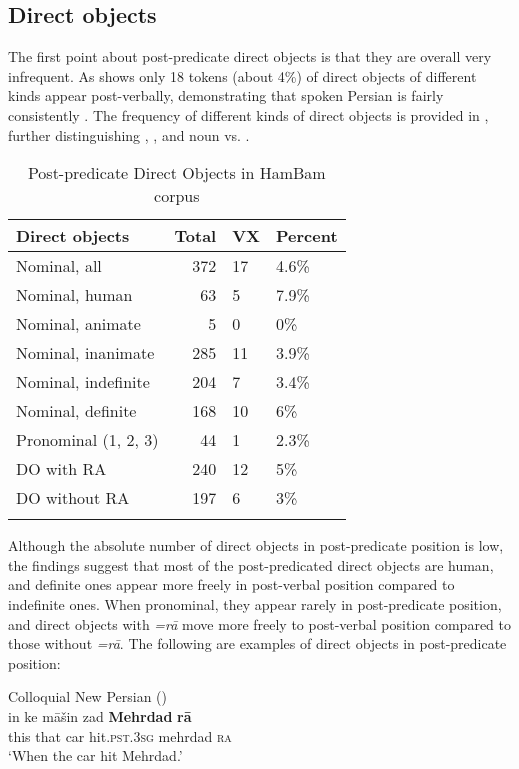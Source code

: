 \documentclass[output=paper,colorlinks,citecolor=brown,draftmode]{langscibook}
\begin{document}
\subsection{Direct objects}\label{Persian:3.2}

The first point about post-predicate direct objects is that they are overall very infrequent. As  shows only 18 tokens (about 4\%) of direct objects of different kinds appear post-verbally, demonstrating that spoken Persian is fairly consistently . The frequency of different kinds of direct objects is provided in , further distinguishing , , and noun vs. .

\begin{table}
 \begin{tabularx}{\textwidth}{lrYY}
\lsptoprule
Direct objects & Total & VX & Percent \\
\midrule
Nominal, all & 372 & 17 & 4.6\% \\
{\quad}Nominal, human & 63 & 5 & 7.9\% \\
{\quad}Nominal, animate & 5 & 0 & 0\% \\
{\quad}Nominal, inanimate & 285 & 11 & 3.9\% \\
Nominal, indefinite & 204 & 7 & 3.4\% \\
Nominal, definite & 168 & 10 & 6\% \\
Pronominal (1, 2, 3) & 44 & 1 & 2.3\% \\
DO with RA & 240 & 12 & 5\% \\
DO without RA & 197 & 6 & 3\% \\
\lspbottomrule
 \end{tabularx}
 \caption{Post-predicate Direct Objects in HamBam corpus}
 \label{Persian:tab:10}
\end{table}

Although the absolute number of direct objects in post-predicate position is low, the findings suggest that most of the post-predicated direct objects are human, and definite ones appear more freely in post-verbal position compared to indefinite ones. When pronominal, they appear rarely in post-predicate position, and direct objects with \textit{=rā} move more freely to post-verbal position compared to those without \textit{=rā}. The following are examples of direct objects in post-predicate position:

\ea\label{Persian:ex:28}
Colloquial New Persian (\citealt[F, 0797]{Izadi2022Persian}) \\
\gll in ke māšin zad \textbf{Mehrdad} \textbf{rā} \\
this that car hit\textsc{.pst.3sg} mehrdad \textsc{ra} \\
\glt `When the car hit Mehrdad.'
\z
\end{document}
